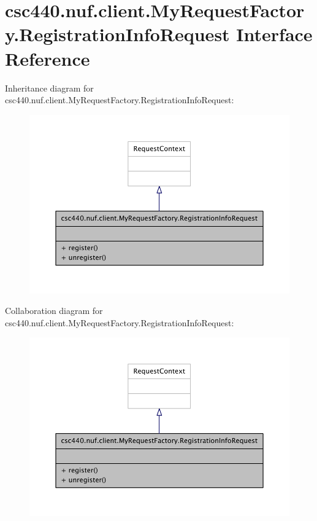 \hypertarget{interfacecsc440_1_1nuf_1_1client_1_1_my_request_factory_1_1_registration_info_request}{\section{csc440.\-nuf.\-client.\-My\-Request\-Factory.\-Registration\-Info\-Request Interface Reference}
\label{interfacecsc440_1_1nuf_1_1client_1_1_my_request_factory_1_1_registration_info_request}
}


Inheritance diagram for csc440.\-nuf.\-client.\-My\-Request\-Factory.\-Registration\-Info\-Request\-:
\nopagebreak
\begin{figure}[H]
\begin{center}
\leavevmode
\includegraphics[width=350pt]{interfacecsc440_1_1nuf_1_1client_1_1_my_request_factory_1_1_registration_info_request__inherit__graph}
\end{center}
\end{figure}


Collaboration diagram for csc440.\-nuf.\-client.\-My\-Request\-Factory.\-Registration\-Info\-Request\-:
\nopagebreak
\begin{figure}[H]
\begin{center}
\leavevmode
\includegraphics[width=350pt]{interfacecsc440_1_1nuf_1_1client_1_1_my_request_factory_1_1_registration_info_request__coll__graph}
\end{center}
\end{figure}
